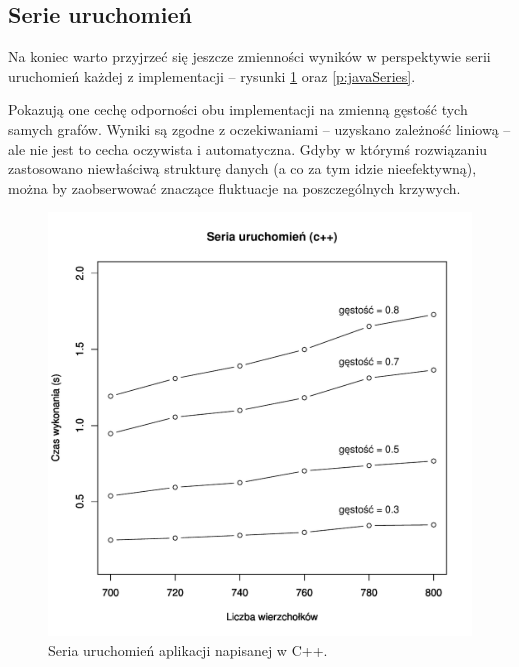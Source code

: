 \subsection{Serie uruchomień}

Na koniec warto przyjrzeć się jeszcze zmienności wyników w perspektywie serii uruchomień każdej z implementacji -- rysunki \ref{p:cppSeries} oraz \ref{p:javaSeries}.

Pokazują one cechę odporności obu implementacji na zmienną gęstość tych samych grafów.
Wyniki są zgodne z oczekiwaniami -- uzyskano zależność liniową -- ale nie jest to cecha oczywista i automatyczna. 
Gdyby w którymś rozwiązaniu zastosowano niewłaściwą strukturę danych (a co za tym idzie nieefektywną), można by zaobserwować znaczące fluktuacje na poszczególnych krzywych.

\begin{figure}
\centering
\includegraphics[scale=0.6]{plots/cppTime_inSeries.pdf}
\caption{Seria uruchomień aplikacji napisanej w C++.}
\label{p:cppSeries}
\end{figure}

